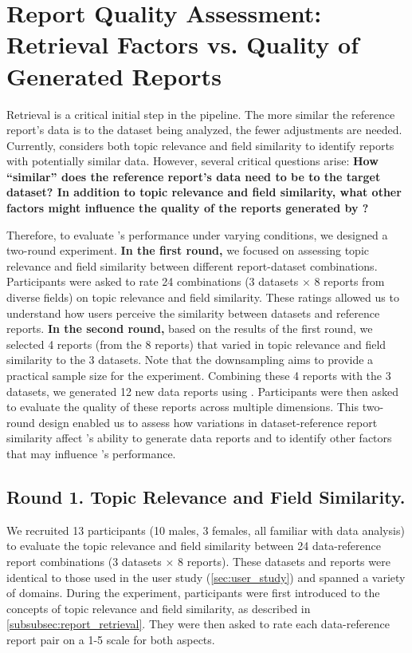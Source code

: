 

\section{Report Quality Assessment: Retrieval Factors vs. Quality of Generated Reports}

Retrieval is a critical initial step in the \system{} pipeline. 
The more similar the reference report's data is to the dataset being analyzed, the fewer adjustments are needed. 
Currently, \system{} considers both topic relevance and field similarity to identify reports with potentially similar data.
However, several critical questions arise: 
\textbf{
How ``similar'' does the reference report's data need to be to the target dataset? 
In addition to topic relevance and field similarity, what other factors might influence the quality of the reports generated by \system{}? }


Therefore, to evaluate \system{}'s performance under varying conditions, we designed a two-round experiment. 
\textbf{In the first round,} we focused on assessing topic relevance and field similarity between different report-dataset combinations. 
Participants were asked to rate 24 combinations (3 datasets $\times$ 8 reports from diverse fields) on topic relevance and field similarity. These ratings allowed us to understand how users perceive the similarity between datasets and reference reports. 
\textbf{In the second round,} based on the results of the first round, we selected 4 reports (from the 8 reports) that varied in topic relevance and field similarity to the 3 datasets.
Note that the downsampling aims to provide a practical sample size for the experiment.
Combining these 4 reports with the 3 datasets, we generated 12 new data reports using \system{}. 
Participants were then asked to evaluate the quality of these reports across multiple dimensions. 
This two-round design enabled us to assess how variations in dataset-reference report similarity affect \system{}'s ability to generate data reports and to identify other factors that may influence \system{}'s performance.


\subsection{Round 1. Topic Relevance and Field Similarity. }
We recruited 13 participants (10 males, 3 females, all familiar with data analysis) to evaluate the topic relevance and field similarity between 24 data-reference report combinations (3 datasets $\times$ 8 reports). 
These datasets and reports were identical to those used in the user study (\autoref{sec:user_study}) and spanned a variety of domains.
During the experiment, participants were first introduced to the concepts of topic relevance and field similarity, as described in \autoref{subsubsec:report_retrieval}. 
They were then asked to rate each data-reference report pair on a 1-5 scale for both aspects. 


